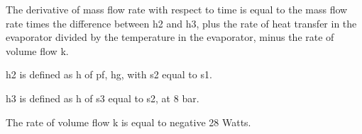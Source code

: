 The derivative of mass flow rate with respect to time is equal to the mass flow rate times the difference between h2 and h3, plus the rate of heat transfer in the evaporator divided by the temperature in the evaporator, minus the rate of volume flow k.

h2 is defined as h of pf, hg, with s2 equal to s1.

h3 is defined as h of s3 equal to s2, at 8 bar.

The rate of volume flow k is equal to negative 28 Watts.